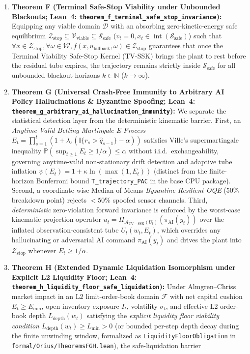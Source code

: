 \begin{enumerate}
    \item \textbf{Theorem F (Terminal Safe-Stop Viability under Unbounded Blackouts; Lean~4: \texttt{theorem\_\allowbreak f\_\allowbreak terminal\_\allowbreak safe\_\allowbreak stop\_\allowbreak invariance}):} Equipping any viable domain $\mathcal{D}$ with an absorbing zero-kinetic-energy safe equilibrium $\mathcal{Z}_{\mathrm{stop}} \subseteq \mathcal{V}_{\mathrm{viable}} \subseteq \mathcal{S}_{\mathrm{safe}}$ ($v_t = 0, x_t \in \operatorname{int}(\mathcal{S}_{\mathrm{safe}})$) such that $\forall x \in \mathcal{Z}_{\mathrm{stop}}, \forall \omega \in \mathcal{W}, f(x, u_{\mathrm{fallback}}, \omega) \in \mathcal{Z}_{\mathrm{stop}}$ guarantees that once the Terminal Viability Safe-Stop Kernel (TV-SSK) brings the plant to rest before the residual tube expires, the trajectory remains strictly inside $\mathcal{S}_{\mathrm{safe}}$ for all unbounded blackout horizons $k \in \mathbb{N}$ ($k \to \infty$).
    \item \textbf{Theorem G (Universal Crash-Free Immunity to Arbitrary AI Policy Hallucinations \& Byzantine Spoofing; Lean~4: \texttt{theorem\_\allowbreak g\_\allowbreak arbitrary\_\allowbreak ai\_\allowbreak hallucination\_\allowbreak immunity}):} We separate the statistical detection layer from the deterministic kinematic barrier. First, an \emph{Anytime-Valid Betting Martingale E-Process} $E_t = \prod_{s=1}^t (1 + \lambda_s(\mathbb{I}\{r_s > \hat{q}_{s-1}\} - \alpha))$ satisfies Ville's supermartingale inequality $\mathbb{P}(\sup_{t\ge 1} E_t \ge 1/\alpha) \le \alpha$ without i.i.d.\ exchangeability, governing anytime-valid non-stationary drift detection and adaptive tube inflation $\psi(E_t) = 1 + \kappa \ln(\max(1, E_t))$ (distinct from the finite-horizon Bonferroni bound \texttt{T\_\allowbreak trajectory\_\allowbreak PAC} in the base CPU package). Second, a coordinate-wise Median-of-Means \emph{Byzantine-Resilient OQE} (50\% breakdown point) rejects $<50\%$ spoofed sensor channels. Third, \emph{deterministic} zero-violation forward invariance is enforced by the worst-case kinematic projection operator $u_t = \Pi_{\mathcal{A}_{\mathrm{TV-SSK}}(U_t)}(\pi_{\mathrm{AI}}(y_t))$ over the inflated observation-consistent tube $U_t(w_t, E_t)$, which overrides any hallucinating or adversarial AI command $\pi_{\mathrm{AI}}(y_t)$ and drives the plant into $\mathcal{Z}_{\mathrm{stop}}$ whenever $E_t \ge 1/\alpha$.
    \item \textbf{Theorem H (Extended Dynamic Liquidation Isomorphism under Explicit L2 Liquidity Floor; Lean~4: \texttt{theorem\_\allowbreak h\_\allowbreak liquidity\_\allowbreak floor\_\allowbreak safe\_\allowbreak liquidation}):} Under Almgren--Chriss market impact in an L2 limit-order-book domain $\mathcal{F}$ with net capital cushion $E_t \ge E_{\min}$, open inventory exposure $I_t$, volatility $\sigma_t$, and effective L2 order-book depth $L_{\mathrm{depth}}(w_t)$ satisfying the \emph{explicit liquidity floor viability condition} $L_{\mathrm{depth}}(w_t) \ge L_{\min} > 0$ (or bounded per-step depth decay during the finite unwinding window, formalized as \texttt{LiquidityFloorObligation} in \texttt{formal/\allowbreak Orius/\allowbreak TheoremsFGH.lean}), the safe-liquidation barrier

\end{enumerate}

